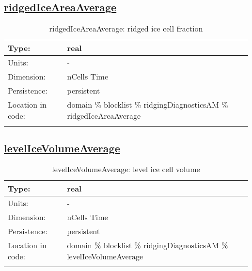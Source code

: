 \subsection[ridgedIceAreaAverage]{\hyperref[sec:var_tab_ridgingDiagnosticsAM]{ridgedIceAreaAverage}}
\label{subsec:var_sec_ridgingDiagnosticsAM_ridgedIceAreaAverage}
\begin{center}
\begin{longtable}{| p{2.0in} | p{4.0in} |}
        \hline 
        Type: & real \\
        \hline 
        Units: & \si{-} \\
        \hline 
        Dimension: & nCells Time \\
        \hline 
        Persistence: & persistent \\
        \hline 
         Location in code: & domain \% blocklist \% ridgingDiagnosticsAM \% ridgedIceAreaAverage \\
         \hline 
    \caption{ridgedIceAreaAverage: ridged ice cell fraction}
\end{longtable}
\end{center}
\subsection[levelIceVolumeAverage]{\hyperref[sec:var_tab_ridgingDiagnosticsAM]{levelIceVolumeAverage}}
\label{subsec:var_sec_ridgingDiagnosticsAM_levelIceVolumeAverage}
\begin{center}
\begin{longtable}{| p{2.0in} | p{4.0in} |}
        \hline 
        Type: & real \\
        \hline 
        Units: & \si{-} \\
        \hline 
        Dimension: & nCells Time \\
        \hline 
        Persistence: & persistent \\
        \hline 
         Location in code: & domain \% blocklist \% ridgingDiagnosticsAM \% levelIceVolumeAverage \\
         \hline 
    \caption{levelIceVolumeAverage: level ice cell volume}
\end{longtable}
\end{center}
